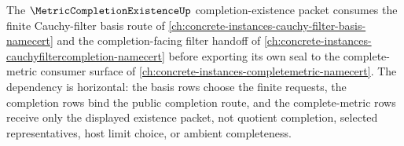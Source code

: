 The $\MetricCompletionExistenceUp$ completion-existence packet consumes the finite Cauchy-filter basis route of \autoref{ch:concrete-instances-cauchy-filter-basis-namecert} and the completion-facing filter handoff of \autoref{ch:concrete-instances-cauchyfiltercompletion-namecert} before exporting its own seal to the complete-metric consumer surface of \autoref{ch:concrete-instances-completemetric-namecert}. The dependency is horizontal: the basis rows choose the finite requests, the completion rows bind the public completion route, and the complete-metric rows receive only the displayed existence packet, not quotient completion, selected representatives, host limit choice, or ambient completeness.
